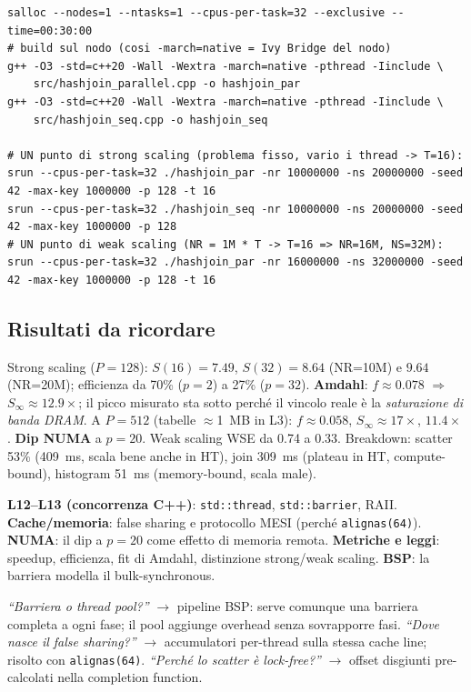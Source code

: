 \documentclass[11pt,a4paper]{article}
\begin{document}
\begin{lstlisting}[style=bash, caption={Sul cluster: Xeon E5-2640 v2, 16 fisici / 32 logici, 2 NUMA.}]
salloc --nodes=1 --ntasks=1 --cpus-per-task=32 --exclusive --time=00:30:00
# build sul nodo (cosi -march=native = Ivy Bridge del nodo)
g++ -O3 -std=c++20 -Wall -Wextra -march=native -pthread -Iinclude \
    src/hashjoin_parallel.cpp -o hashjoin_par
g++ -O3 -std=c++20 -Wall -Wextra -march=native -pthread -Iinclude \
    src/hashjoin_seq.cpp -o hashjoin_seq

# UN punto di strong scaling (problema fisso, vario i thread -> T=16):
srun --cpus-per-task=32 ./hashjoin_par -nr 10000000 -ns 20000000 -seed 42 -max-key 1000000 -p 128 -t 16
srun --cpus-per-task=32 ./hashjoin_seq -nr 10000000 -ns 20000000 -seed 42 -max-key 1000000 -p 128
# UN punto di weak scaling (NR = 1M * T -> T=16 => NR=16M, NS=32M):
srun --cpus-per-task=32 ./hashjoin_par -nr 16000000 -ns 32000000 -seed 42 -max-key 1000000 -p 128 -t 16
\end{lstlisting}

\subsection{Risultati da ricordare}

Strong scaling ($P=128$): $S(16)=7.49$, $S(32)=8.64$ (NR=10M) e $9.64$ (NR=20M); efficienza da 70\% ($p=2$) a 27\% ($p=32$). \textbf{Amdahl}: $f\approx 0.078$ $\Rightarrow$ $S_\infty\approx 12.9\times$; il picco misurato sta sotto perché il vincolo reale è la \emph{saturazione di banda DRAM}. A \textbf{$P=512$} (tabelle $\approx$1~MB in L3): $f\approx 0.058$, $S_\infty\approx 17\times$, $11.4\times$. \textbf{Dip NUMA} a $p=20$. Weak scaling WSE da 0.74 a 0.33. Breakdown: scatter 53\% (409~ms, scala bene anche in HT), join 309~ms (plateau in HT, compute-bound), histogram 51~ms (memory-bound, scala male).

\begin{theorybox}
\textbf{L12--L13 (concorrenza C++)}: \texttt{std::thread}, \texttt{std::barrier}, RAII. \textbf{Cache/memoria}: false sharing e protocollo MESI (perché \texttt{alignas(64)}). \textbf{NUMA}: il dip a $p=20$ come effetto di memoria remota. \textbf{Metriche e leggi}: speedup, efficienza, fit di Amdahl, distinzione strong/weak scaling. \textbf{BSP}: la barriera modella il bulk-synchronous.
\end{theorybox}

\begin{qbox}[M2]
\emph{``Barriera o thread pool?''} $\to$ pipeline BSP: serve comunque una barriera completa a ogni fase; il pool aggiunge overhead senza sovrapporre fasi. \emph{``Dove nasce il false sharing?''} $\to$ accumulatori per-thread sulla stessa cache line; risolto con \texttt{alignas(64)}. \emph{``Perché lo scatter è lock-free?''} $\to$ offset disgiunti pre-calcolati nella completion function.
\end{qbox}
\end{document}
